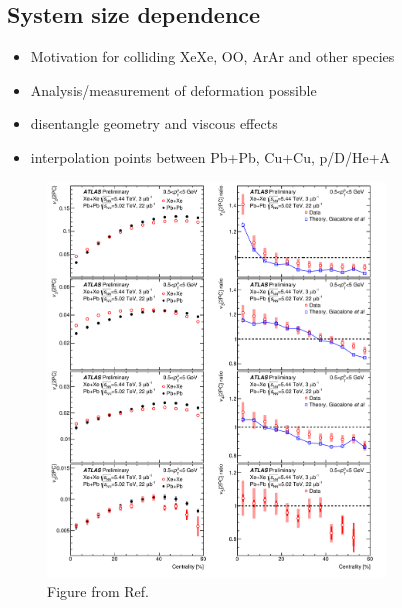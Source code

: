 \subsection{System size dependence}

\begin{itemize}
\item Motivation for colliding XeXe,  OO,  ArAr and other species
\item Analysis/measurement of deformation possible
\item disentangle geometry and viscous effects
\item interpolation points between Pb+Pb,  Cu+Cu,  p/D/He+A
\end{itemize}


\begin{figure}[!htb]
\begin{center}
\includegraphics[width=0.8\textwidth]{figs/atlas_xexe_vn}
\caption{
	Figure from Ref.~\cite{ATLAS-CONF-2018-011}
}
\label{fig:atlas_xexe_vn}
\end{center}
\end{figure}

